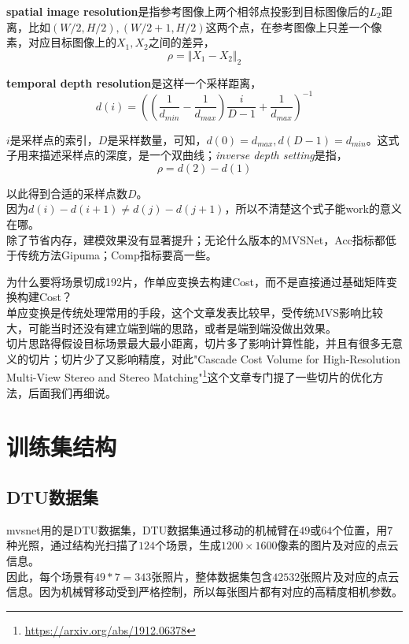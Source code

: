 		\textbf{spatial image resolution}是指参考图像上两个相邻点投影到目标图像后的$L_2$距离，比如$(W/2,H/2),(W/2+1,H/2)$这两个点，在参考图像上只差一个像素，对应目标图像上的$X_1,X_2$之间的差异，
		$$
			\rho = \Vert X_1 - X_2\Vert_2
		$$

		\textbf{temporal depth resolution}是这样一个采样距离，
		$$
			d(i) = 
				\left(
					\left(
						\frac{1}{d_{min}} - \frac{1}{d_{max}}
					\right)\frac{i}{D-1}
					+ \frac{1}{d_{max}}
				\right)^{-1}
		$$

		$i$是采样点的索引，$D$是采样数量，可知，$d(0) = d_{max},d(D-1) = d_{min}$。这式子用来描述采样点的深度，是一个双曲线；\textit{inverse depth setting}是指，
		$$
			\rho = d(2) - d(1)
		$$

		以此得到合适的采样点数$D$。\\

		因为$d(i) - d(i+1) \ne d(j) - d(j+1)$，所以不清楚这个式子能work的意义在哪。\\

		除了节省内存，建模效果没有显著提升；无论什么版本的MVSNet，Acc指标都低于传统方法Gipuma；Comp指标要高一些。

	为什么要将场景切成192片，作单应变换去构建Cost，而不是直接通过基础矩阵变换构建Cost？\\

	单应变换是传统处理常用的手段，这个文章发表比较早，受传统MVS影响比较大，可能当时还没有建立端到端的思路，或者是端到端没做出效果。\\

	切片思路得假设目标场景最大最小距离，切片多了影响计算性能，并且有很多无意义的切片；切片少了又影响精度，对此"Cascade Cost Volume for High-Resolution Multi-View Stereo and Stereo Matching"\footnote{\url{https://arxiv.org/abs/1912.06378}}这个文章专门提了一些切片的优化方法，后面我们再细说。

\section{训练集结构}
	
	\subsection*{DTU数据集} 
		mvsnet用的是DTU数据集，DTU数据集通过移动的机械臂在$49$或$64$个位置，用$7$种光照，通过结构光扫描了$124$个场景，生成$1200 \times 1600$像素的图片及对应的点云信息。\\

		因此，每个场景有$49 * 7 = 343$张照片，整体数据集包含$42532$张照片及对应的点云信息。因为机械臂移动受到严格控制，所以每张图片都有对应的高精度相机参数。\\

